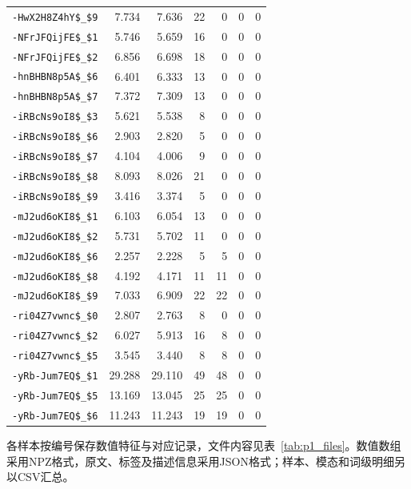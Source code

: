 \begin{longtable}{lrrrrrr}
\nolinkurl{-HwX2H8Z4hY$_$9} & 7.734 & 7.636 & 22 & 0 & 0 & 0\\
\nolinkurl{-NFrJFQijFE$_$1} & 5.746 & 5.659 & 16 & 0 & 0 & 0\\
\nolinkurl{-NFrJFQijFE$_$2} & 6.856 & 6.698 & 18 & 0 & 0 & 0\\
\nolinkurl{-hnBHBN8p5A$_$6} & 6.401 & 6.333 & 13 & 0 & 0 & 0\\
\nolinkurl{-hnBHBN8p5A$_$7} & 7.372 & 7.309 & 13 & 0 & 0 & 0\\
\nolinkurl{-iRBcNs9oI8$_$3} & 5.621 & 5.538 & 8 & 0 & 0 & 0\\
\nolinkurl{-iRBcNs9oI8$_$6} & 2.903 & 2.820 & 5 & 0 & 0 & 0\\
\nolinkurl{-iRBcNs9oI8$_$7} & 4.104 & 4.006 & 9 & 0 & 0 & 0\\
\nolinkurl{-iRBcNs9oI8$_$8} & 8.093 & 8.026 & 21 & 0 & 0 & 0\\
\nolinkurl{-iRBcNs9oI8$_$9} & 3.416 & 3.374 & 5 & 0 & 0 & 0\\
\nolinkurl{-mJ2ud6oKI8$_$1} & 6.103 & 6.054 & 13 & 0 & 0 & 0\\
\nolinkurl{-mJ2ud6oKI8$_$2} & 5.731 & 5.702 & 11 & 0 & 0 & 0\\
\nolinkurl{-mJ2ud6oKI8$_$6} & 2.257 & 2.228 & 5 & 5 & 0 & 0\\
\nolinkurl{-mJ2ud6oKI8$_$8} & 4.192 & 4.171 & 11 & 11 & 0 & 0\\
\nolinkurl{-mJ2ud6oKI8$_$9} & 7.033 & 6.909 & 22 & 22 & 0 & 0\\
\nolinkurl{-ri04Z7vwnc$_$0} & 2.807 & 2.763 & 8 & 0 & 0 & 0\\
\nolinkurl{-ri04Z7vwnc$_$2} & 6.027 & 5.913 & 16 & 8 & 0 & 0\\
\nolinkurl{-ri04Z7vwnc$_$5} & 3.545 & 3.440 & 8 & 8 & 0 & 0\\
\nolinkurl{-yRb-Jum7EQ$_$1} & 29.288 & 29.110 & 49 & 48 & 0 & 0\\
\nolinkurl{-yRb-Jum7EQ$_$5} & 13.169 & 13.045 & 25 & 25 & 0 & 0\\
\nolinkurl{-yRb-Jum7EQ$_$6} & 11.243 & 11.243 & 19 & 19 & 0 & 0\\
\end{longtable}
\endgroup

各样本按编号保存数值特征与对应记录，文件内容见表~\ref{tab:p1_files}。数值数组采用NPZ格式，原文、标签及描述信息采用JSON格式；样本、模态和词级明细另以CSV汇总。


